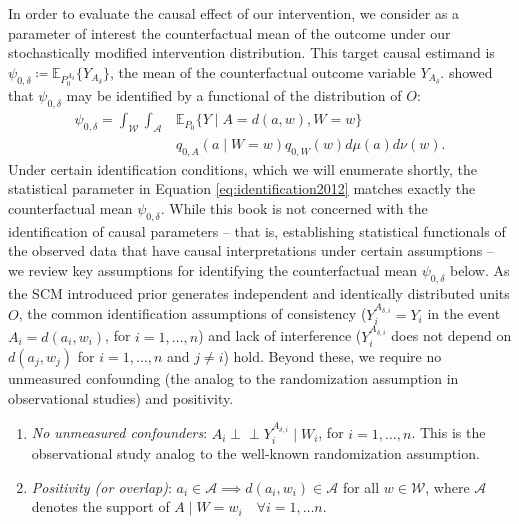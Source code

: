 \documentclass[
  12pt, krantz2,
]{krantz}
\providecommand{\tightlist}{%
  \setlength{\itemsep}{0pt}\setlength{\parskip}{0pt}}
\newcommand{\E}{\mathbb{E}}
\newcommand{\1}{\mathbbm{1}}
\newcommand{\indep}{\mbox{$\perp\!\!\!\perp$}}
\theoremstyle{definition}
\theoremstyle{definition}
\theoremstyle{definition}
\theoremstyle{definition}
\theoremstyle{remark}
\begin{document}
In order to evaluate the causal effect of our intervention, we consider as a
parameter of interest the counterfactual mean of the outcome under our
stochastically modified intervention distribution. This target causal estimand
is \(\psi_{0, \delta} \coloneqq \E_{P_0^{A_{\delta}}}\{Y_{A_{\delta}}\}\), the
mean of the counterfactual outcome variable \(Y_{A_{\delta}}\).
\citet{diaz2018stochastic} showed that \(\psi_{0, \delta}\) may be identified by a
functional of the distribution of \(O\):
\begin{align}
  \psi_{0,\delta} = \int_{\mathcal{W}} \int_{\mathcal{A}} & \E_{P_0}
   \{Y \mid A = d(a, w), W = w\} \nonumber \\ &q_{0, A}(a \mid W = w)
   q_{0, W}(w) d\mu(a)d\nu(w).
  \label{eq:identification2012}
\end{align}
Under certain identification conditions, which we will enumerate shortly, the
statistical parameter in Equation \eqref{eq:identification2012} matches exactly
the counterfactual mean \(\psi_{0, \delta}\). While this book is not concerned
with the identification of causal parameters -- that is, establishing
statistical functionals of the observed data that have causal interpretations
under certain assumptions -- we review key assumptions for identifying the
counterfactual mean \(\psi_{0, \delta}\) below. As the SCM introduced prior
generates independent and identically distributed units \(O\), the common
identification assumptions of consistency (\(Y^{A_{\delta,i}}_i = Y_i\) in the
event \(A_i = d(a_i, w_i)\), for \(i = 1, \ldots, n\)) and lack of interference
(\(Y^{A_{\delta,i}}_i\) does not depend on \(d(a_j, w_j)\) for \(i = 1, \ldots, n\)
and \(j \neq i\)) hold. Beyond these, we require no unmeasured confounding (the
analog to the randomization assumption in observational studies) and positivity.

\begin{enumerate}
\def\labelenumi{\arabic{enumi}.}
\tightlist
\item
  \emph{No unmeasured confounders}: \(A_i \indep Y^{A_{\delta,i}}_i \mid W_i\), for
  \(i = 1, \ldots, n\). This is the observational study analog to the well-known
  randomization assumption.
\item
  \emph{Positivity (or overlap)}: \(a_i \in \mathcal{A} \implies d(a_i, w_i) \in \mathcal{A}\) for all \(w \in \mathcal{W}\), where \(\mathcal{A}\) denotes the
  support of \(A \mid W = w_i \quad \forall i = 1, \ldots n\).
\end{enumerate}
\end{document}

